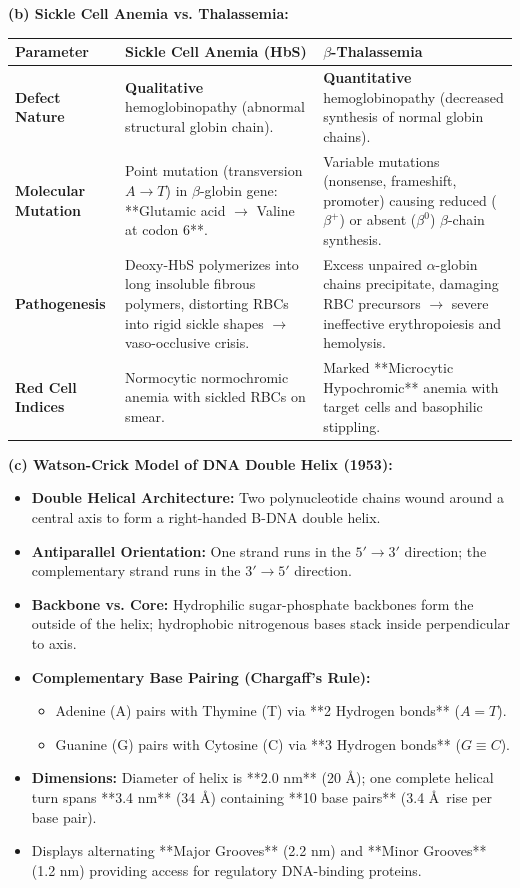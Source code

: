 \documentclass[11pt,a4paper]{article}
\begin{document}
\begin{ansbox}
\textbf{(b) Sickle Cell Anemia vs. Thalassemia:}
\begin{center}
\begin{tabularx}{\textwidth}{p{3.2cm}X X}
\toprule
\textbf{Parameter} & \textbf{Sickle Cell Anemia (HbS)} & \textbf{$\beta$-Thalassemia} \\
\midrule
\textbf{Defect Nature} & \textbf{Qualitative} hemoglobinopathy (abnormal structural globin chain). & \textbf{Quantitative} hemoglobinopathy (decreased synthesis of normal globin chains). \\
\textbf{Molecular Mutation} & Point mutation (transversion $A \rightarrow T$) in $\beta$-globin gene: **Glutamic acid $\rightarrow$ Valine at codon 6**. & Variable mutations (nonsense, frameshift, promoter) causing reduced ($\beta^+$) or absent ($\beta^0$) $\beta$-chain synthesis. \\
\textbf{Pathogenesis} & Deoxy-HbS polymerizes into long insoluble fibrous polymers, distorting RBCs into rigid sickle shapes $\rightarrow$ vaso-occlusive crisis. & Excess unpaired $\alpha$-globin chains precipitate, damaging RBC precursors $\rightarrow$ severe ineffective erythropoiesis and hemolysis. \\
\textbf{Red Cell Indices} & Normocytic normochromic anemia with sickled RBCs on smear. & Marked **Microcytic Hypochromic** anemia with target cells and basophilic stippling. \\
\bottomrule
\end{tabularx}
\end{center}

\textbf{(c) Watson-Crick Model of DNA Double Helix (1953):}
\begin{itemize}[leftmargin=*]
    \item \textbf{Double Helical Architecture:} Two polynucleotide chains wound around a central axis to form a right-handed B-DNA double helix.
    \item \textbf{Antiparallel Orientation:} One strand runs in the $5' \rightarrow 3'$ direction; the complementary strand runs in the $3' \rightarrow 5'$ direction.
    \item \textbf{Backbone vs. Core:} Hydrophilic sugar-phosphate backbones form the outside of the helix; hydrophobic nitrogenous bases stack inside perpendicular to axis.
    \item \textbf{Complementary Base Pairing (Chargaff's Rule):}
    \begin{itemize}
        \item Adenine (A) pairs with Thymine (T) via **2 Hydrogen bonds** ($A = T$).
        \item Guanine (G) pairs with Cytosine (C) via **3 Hydrogen bonds** ($G \equiv C$).
    \end{itemize}
    \item \textbf{Dimensions:} Diameter of helix is **2.0 nm** (20 \AA); one complete helical turn spans **3.4 nm** (34 \AA) containing **10 base pairs** (3.4 \AA\ rise per base pair).
    \item Displays alternating **Major Grooves** (2.2 nm) and **Minor Grooves** (1.2 nm) providing access for regulatory DNA-binding proteins.
\end{itemize}
\end{ansbox}
\end{document}
